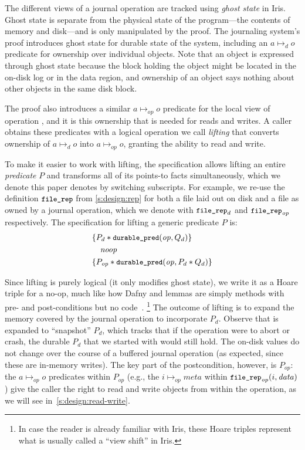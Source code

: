 The different views of a journal operation are tracked using \emph{ghost state} in Iris.  Ghost state is separate from
the physical state of the program---the contents of memory and disk---and is
only manipulated by the proof. The journaling system's proof introduces ghost
state for durable state of the system, including an $a \mapsto_{d} o$ predicate
for ownership over individual objects. Note that an object is expressed through
ghost state because the block holding the object might be located in the on-disk
log or in the data region, and ownership of an object says nothing about other
objects in the same disk block.

The proof also introduces a similar $a \mapsto_{\mathit{op}} o$ predicate for the local
view of operation , and it is this ownership that is needed for reads and
writes. A caller obtains these predicates with a logical operation we call
\emph{lifting} that converts ownership of $a \mapsto_{d} o$ into $a \mapsto_{\mathit{op}} o$, granting the
ability to read and write.


To make it easier to work with lifting, the specification allows lifting an
entire \emph{predicate} $P$ and transforms all of its points-to facts
simultaneously, which we denote this paper denotes by switching subscripts. For
example, we re-use
the definition $\cc{file_rep}$ from \cref{s:design:rep} for both a file laid
out on disk and a file as owned by a journal operation, which we denote with
$\cc{file_rep}_{d}$ and $\cc{file_rep}_{\mathit{op}}$ respectively. The specification
for lifting a generic predicate $P$ is:
%
\begin{align*}
  \hoareV{P_d \sep \bufobjDurable(\mathit{op}, Q_d)}{\SKIP}{P_{\mathit{op}} \sep \bufobjDurable(\mathit{op}, P_d \sep Q_d)}
\end{align*}

Since lifting is purely logical (it only modifies ghost state), we
write it as a Hoare triple for a no-op, much like how Dafny and \fstar lemmas
are simply methods with pre- and post-conditions but no code~\cite[\S 12.2.3]{dafny-refman}.%
\footnote{In case the reader is already familiar with Iris, these Hoare triples represent
what is usually called a ``view shift'' in Iris.}
The outcome of lifting is to expand the memory covered by the journal operation to
incorporate $P_{d}$. Observe that \bufobjDurable is expanded to ``snapshot''
$P_{d}$, which tracks that if the operation were to abort or crash, the
durable $P_d$ that we started with would still hold.  The on-disk values
do not change over the course of a buffered journal operation (as expected, since these are
in-memory writes). The key part of the postcondition, however, is $P_{op}$: the
$a \mapsto_{op} o$ predicates within $P_{op}$ (e.g., the
$i \mapsto_{\mathit{op}} \mathit{meta}$ within $\cc{file_rep}_{\mathit{op}}(i, \mathit{data})$)
give the caller
the right to read and write objects from within the operation, as we will see
in~\cref{s:design:read-write}.

